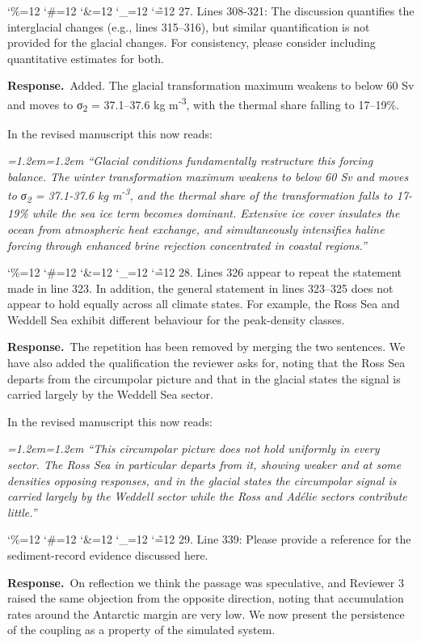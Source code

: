 \documentclass[11pt,a4paper]{article}
\newcommand{\comment}[1]{\par\medskip\noindent\color{black}\begingroup\catcode`\%=12 \catcode`\#=12 \catcode`\&=12 \catcode`\_=12 \catcode`\~=12 \commentbody}
\newcommand{\commentbody}[1]{#1\endgroup\par\smallskip}
\newcommand{\response}{\par\noindent\color{chgcol}\textbf{Response.}\ }
\newenvironment{change}{\par\smallskip\color{chgcol}\small\itshape\leftskip=1.2em\rightskip=1.2em\noindent\ignorespaces}{\par\smallskip}
\begin{document}
\comment{R1}{27. Lines 308-321: The discussion quantifies the interglacial changes (e.g., lines 315–316), but similar quantification is not provided for the glacial changes. For consistency, please consider including quantitative estimates for both.}

\response Added. The glacial transformation maximum weakens to below 60 Sv and moves to σ\textsubscript{2} = 37.1–37.6 kg m\textsuperscript{-3}, with the thermal share falling to 17–19\%.

In the revised manuscript this now reads:

\begin{change}
``Glacial conditions fundamentally restructure this forcing balance. The winter transformation maximum weakens to below 60 Sv and moves to σ\textsubscript{2} = 37.1-37.6 kg m\textsuperscript{-3}, and the thermal share of the transformation falls to 17-19\% while the sea ice term becomes dominant. Extensive ice cover insulates the ocean from atmospheric heat exchange, and simultaneously intensifies haline forcing through enhanced brine rejection concentrated in coastal regions.''
\end{change}

\comment{R1}{28. Lines 326 appear to repeat the statement made in line 323. In addition, the general statement in lines 323–325 does not appear to hold equally across all climate states. For example, the Ross Sea and Weddell Sea exhibit different behaviour for the peak-density classes.}

\response The repetition has been removed by merging the two sentences. We have also added the qualification the reviewer asks for, noting that the Ross Sea departs from the circumpolar picture and that in the glacial states the signal is carried largely by the Weddell Sea sector.

In the revised manuscript this now reads:

\begin{change}
``This circumpolar picture does not hold uniformly in every sector. The Ross Sea in particular departs from it, showing weaker and at some densities opposing responses, and in the glacial states the circumpolar signal is carried largely by the Weddell sector while the Ross and Adélie sectors contribute little.''
\end{change}

\comment{R1}{29. Line 339: Please provide a reference for the sediment-record evidence discussed here.}

\response On reflection we think the passage was speculative, and Reviewer 3 raised the same objection from the opposite direction, noting that accumulation rates around the Antarctic margin are very low. We now present the persistence of the coupling as a property of the simulated system.
\end{document}
